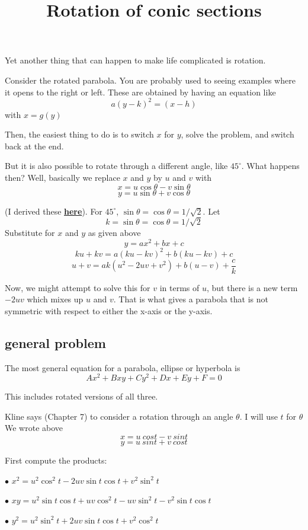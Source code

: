 \documentclass[11pt, oneside]{article}
\title{Rotation of conic sections}
\date{}
\begin{document}
\maketitle
\Large
Yet another thing that can happen to make life complicated is rotation.

Consider the rotated parabola.  You are probably used to seeing examples where it opens to the right or left.  These are obtained by having an equation like
\[ a(y-k)^2 = (x-h)  \]
with $x = g(y)$

Then, the easiest thing to do is to switch $x$ for $y$, solve the problem, and switch back at the end.

But it is also possible to rotate through a different angle, like $45^\circ$.  What happens then?  Well, basically we replace $x$ and $y$ by $u$ and $v$ with
\[ x = u \cos \theta - v \sin \theta \]
\[ y = u \sin \theta + v \cos \theta \]

(I derived these  \hyperref[sec:Geometric_rotation]{\textbf{here}}).
For $45^\circ$, $\sin \theta = \cos \theta = 1/ \sqrt{2}$.
Let
\[ k = \sin \theta = \cos \theta = 1/ \sqrt{2} \]
Substitute for $x$ and $y$ as given above
\[ y = ax^2 + bx + c \]
\[ ku + kv = a(ku - kv)^2 + b(ku - kv) + c \]
\[ u + v = ak(u^2 - 2uv + v^2) + b(u - v) + \frac{c}{k} \]

Now, we might attempt to solve this for $v$ in terms of $u$, but there is a new term $-2uv$ which mixes up $u$ and $v$.  That is what gives a parabola that is not symmetric with respect to either the x-axis or the y-axis.

\subsection*{general problem}
The most general equation for a parabola, ellipse or hyperbola is
\[ Ax^2 + Bxy + Cy^2 + Dx + Ey + F = 0 \]

This includes rotated versions of all three.

Kline says (Chapter 7) to consider a rotation through an angle $\theta$.  I will use $t$ for $\theta$ 
We wrote above
\[ x = u \ cos t - v \ sin t \]
\[ y = u \ sin t + v \ cos t \]

First compute the products: 

$\bullet$  $x^2 = u^2 \cos^2 t - 2 uv \sin t \cos t + v^2 \sin^2 t$

$\bullet$  $xy = u^2 \sin t \cos t + uv \cos^2 t - uv \sin^2 t - v^2 \sin t \cos t$

$\bullet$  $y^2 = u^2 \sin^2 t + 2uv \sin t \cos t + v^2 \cos^2 t$
\end{document}
